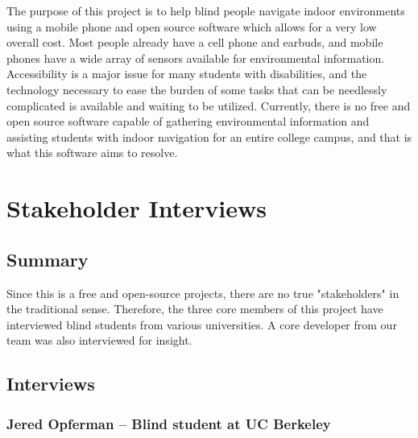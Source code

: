 \documentclass{scrreprt}
\begin{document}
The purpose of this project is to help blind people navigate indoor environments using a mobile phone and open source software which allows for a very low
overall cost. Most people already have a cell phone and earbuds, and mobile phones have a
wide array of sensors available for environmental information. Accessibility is a major issue for
many students with disabilities, and the technology necessary to ease the burden of some tasks
that can be needlessly complicated is available and waiting to be utilized. Currently, there is no
free and open source software capable of gathering environmental information and assisting
students with indoor navigation for an entire college campus, and that is what this software aims to resolve.

\chapter{Stakeholder Interviews}

	\section{Summary}
	
	Since this is a free and open-source projects, there are no true "stakeholders" in the traditional sense. Therefore, the three core members of this project have interviewed blind students from various universities. A core developer from our team was also interviewed for insight.
	
	\section{Interviews}
	
\subsection{Jered Opferman – Blind student at UC Berkeley}
	
\end{document}
